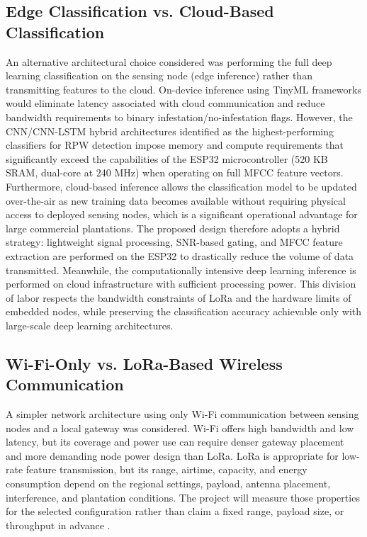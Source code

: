 \documentclass[12pt,a4paper,oneside]{memoir}
\newcommand{\newrevision}[1]{\textcolor{green!45!black}{#1}}
\begin{document}
\subsection{Edge Classification vs. Cloud-Based Classification}

An alternative architectural choice considered was performing the full deep learning classification on the sensing node (edge inference) rather than transmitting features to the cloud. On-device inference using TinyML frameworks would eliminate latency associated with cloud communication and reduce bandwidth requirements to binary infestation/no-infestation flags. However, the CNN/CNN-LSTM hybrid architectures identified as the highest-performing classifiers for RPW detection impose memory and compute requirements that significantly exceed the capabilities of the ESP32 microcontroller (520 KB SRAM, dual-core at 240 MHz) when operating on full MFCC feature vectors. Furthermore, cloud-based inference allows the classification model to be updated over-the-air as new training data becomes available without requiring physical access to deployed sensing nodes, which is a significant operational advantage for large commercial plantations. The proposed design therefore adopts a hybrid strategy: lightweight signal processing, SNR-based gating, and MFCC feature extraction are performed on the ESP32 to drastically reduce the volume of data transmitted. Meanwhile, the computationally intensive deep learning inference is performed on cloud infrastructure with sufficient processing power. This division of labor respects the bandwidth constraints of LoRa and the hardware limits of embedded nodes, while preserving the classification accuracy achievable only with large-scale deep learning architectures.

\subsection{Wi-Fi-Only vs. LoRa-Based Wireless Communication}

\newrevision{A simpler network architecture using only Wi-Fi communication between sensing nodes and a local gateway was considered. Wi-Fi offers high bandwidth and low latency, but its coverage and power use can require denser gateway placement and more demanding node power design than LoRa. LoRa is appropriate for low-rate feature transmission, but its range, airtime, capacity, and energy consumption depend on the regional settings, payload, antenna placement, interference, and plantation conditions. The project will measure those properties for the selected configuration rather than claim a fixed range, payload size, or throughput in advance \cite{lorawan2023}.}
\end{document}

